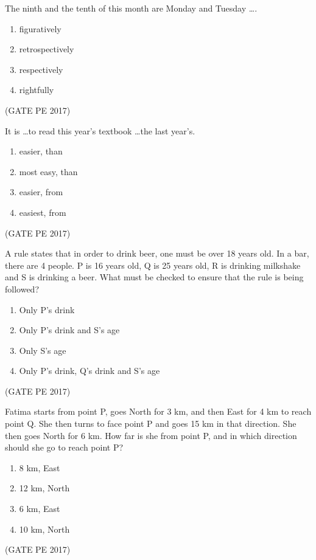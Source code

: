 \documentclass[journal,12pt,onecolumn]{IEEEtran}
\theoremstyle{remark}
\begin{document}
\begin{enumerate}
{\item The ninth and the tenth of this month are Monday and Tuesday \dots.
\begin{enumerate}
\item figuratively
\item retrospectively
\item respectively
\item rightfully
\end{enumerate}
\hfill{(GATE PE 2017)}

\item It is \dots to read this year's textbook \dots the last year's.
\begin{enumerate}
\item easier, than
\item most easy, than
\item easier, from
\item easiest, from
\end{enumerate}
\hfill{(GATE PE 2017)}

\item A rule states that in order to drink beer, one must be over 18 years old. In a bar, there are 4 people. P is 16 years old, Q is 25 years old, R is drinking milkshake and S is drinking a beer. What must be checked to ensure that the rule is being followed?
\begin{enumerate}
\item Only P's drink
\item Only P's drink and S's age
\item Only S's age
\item Only P's drink, Q's drink and S's age
\end{enumerate}
\hfill{(GATE PE 2017)}

\item Fatima starts from point P, goes North for 3 km, and then East for 4 km to reach point Q. She then turns to face point P and goes 15 km in that direction. She then goes North for 6 km. How far is she from point P, and in which direction should she go to reach point P?
\begin{enumerate}
\item 8 km, East
\item 12 km, North
\item 6 km, East
\item 10 km, North
\end{enumerate}
\hfill{(GATE PE 2017)}

}
\end{enumerate}
\end{document}
